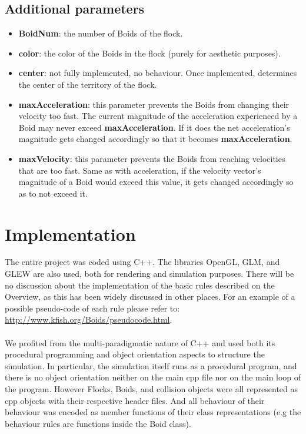 \documentclass[12pt]{article}
\begin{document}
\subsection{Additional parameters}
\begin{itemize}
	\item \textbf{BoidNum}: the number of Boids of the flock.
	\item \textbf{color}: the color of the Boids in the flock (purely for aesthetic purposes).
	\item \textbf{center}: not fully implemented, no behaviour. Once implemented, determines the center of the territory of the flock.
	\item \textbf{maxAcceleration}: this parameter prevents the Boids from changing their velocity too fast. The current magnitude of the acceleration experienced by a Boid may never exceed \textbf{maxAcceleration}. If it does the net acceleration's magnitude gets changed accordingly so that it becomes \textbf{maxAcceleration}.
	\item \textbf{maxVelocity}: this parameter prevents the Boids from reaching velocities that are too fast. Same as with acceleration, if the velocity vector's magnitude of a Boid would exceed this value, it gets changed accordingly so as to not exceed it. 
\end{itemize}

\section{Implementation}
The entire project was coded using C++. The libraries OpenGL, GLM, and GLEW are also used, both for rendering and simulation purposes. There will be no discussion about the implementation of the basic rules described on the Overview, as this has been widely discussed in other places. For an example of a possible pseudo-code of each rule please refer to: \url{http://www.kfish.org/Boids/pseudocode.html}.
\\ \\
We profited from the multi-paradigmatic nature of C++ and used both its procedural programming and object orientation aspects to structure the simulation. In particular, the simulation itself runs as a procedural program, and there is no object orientation neither on the main cpp file nor on the main loop of the program. However Flocks, Boids, and collision objects were all represented as cpp objects with their respective header files. And all behaviour of their behaviour was encoded as member functions of their class representations (e.g the behaviour rules are functions inside the Boid class). 
\end{document}
